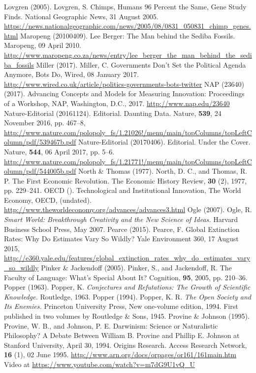 \begin{multicols}{2}
\begin{thebibliography}{99}
 Lovgren (2005). Lovgren, S. Chimps, Humans 96 Percent the Same, Gene Study Finds. National Geographic News, 31 August 2005. \url{https://news.nationalgeographic.com/news/2005/08/0831_050831_chimp_genes.html}
 Maropeng (20100409). Lee Berger: The Man behind the Sediba Fossils. Maropeng, 09 April 2010. \url{http://www.maropeng.co.za/news/entry/lee_berger_the_man_behind_the_sediba_fossils}
 Miller (2017). Miller, C. Governments Don't Set the Political Agenda Anymore, Bots Do, Wired, 08 January 2017. \url{http://www.wired.co.uk/article/politics-governments-bots-twitter}
 NAP (23640) (2017). Advancing Concepts and Models for Measuring Innovation: Proceedings of a Workshop, NAP, Washington, D.C., 2017. \url{http://www.nap.edu/23640}
 Nature-Editorial (20161124). Editorial. Daunting Data. Nature, \textbf{539}, 24 November 2016, pp. 467--8, \url{http://www.nature.com/polopoly_fs/1.21026!/menu/main/topColumns/topLeftColumn/pdf/539467b.pdf}
 Nature-Editorial (20170406). Editorial. Under the Cover. Nature, \textbf{544}, 06 April 2017, pp. 5--6. \url{http://www.nature.com/polopoly_fs/1.21771!/menu/main/topColumns/topLeftColumn/pdf/544005b.pdf}
 North \& Thomas (1977). North, D. C., and Thomas, R. P. The First Economic Revolution. The Economic History Review, \textbf{30} (2), 1977, pp. 229--241.
 OECD (). Technological and Institutional Innovation, The World Economy, OECD, (undated). \url{http://www.theworldeconomy.org/advances/advances3.html}
 Ogle (2007). Ogle, R. \textit{Smart World: Breakthrough Creativity and the New Science of Ideas.} Harvard Business School Press, May 2007.
 Pearce (2015). Pearce, F. Global Extinction Rates: Why Do Estimates Vary So Wildly? Yale Environment 360, 17 August 2015, \url{http://e360.yale.edu/features/global_extinction_rates_why_do_estimates_vary_so_wildly}
 Pinker \& Jackendoff (2005). Pinker, S., and Jackendoff, R. The Faculty of Language: What’s Special About It? Cognition, \textbf{95}, 2005, pp. 210--36.
 Popper (1963). Popper, K. \textit{Conjectures and Refutations: The Growth of Scientific Knowledge.} Routledge, 1963.
 Popper (1994). Popper, K. R. \textit{The Open Society and Its Enemies.} Princeton University Press, New one-volume edition, 1994. First published in two volumes by Routledge \& Sons, 1945.
 Provine \& Johnson (1995). Provine, W. B., and Johnson, P. E. Darwinism: Science or Naturalistic Philosophy? A Debate Between William B. Provine and Phillip E. Johnson at Stanford University, April 30, 1994. Origins Research. Access Research Network, \textbf{16} (1), 02 June 1995. \url{http://www.arn.org/docs/orpages/or161/161main.htm} Video at \url{https://www.youtube.com/watch?v=m7dG9U1vQ_U}

\end{thebibliography}
\end{multicols}

